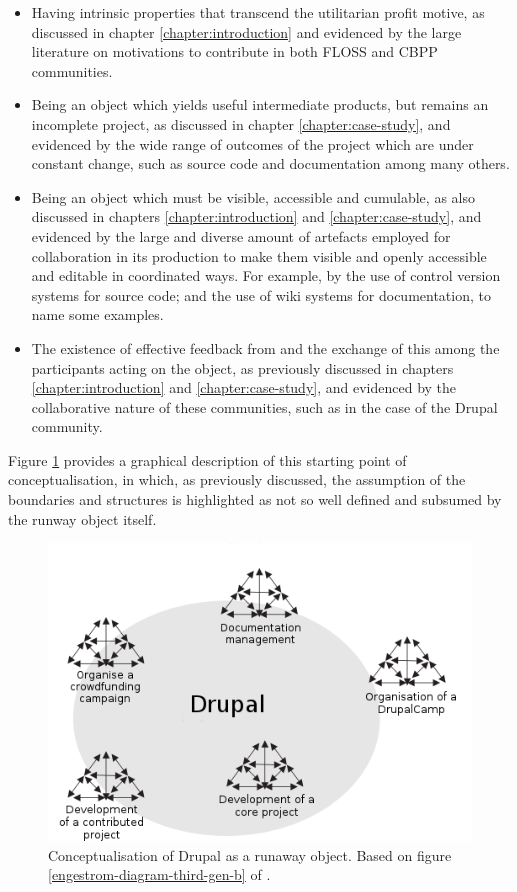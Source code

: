 \begin{itemize}
	\item Having intrinsic properties that transcend the utilitarian profit motive, as discussed in chapter \ref{chapter:introduction} and evidenced by the large literature on motivations to contribute in both FLOSS and CBPP communities. 
	\item Being an object which yields useful intermediate products, but remains an incomplete project, as discussed in chapter \ref{chapter:case-study}, and evidenced by the wide range of outcomes of the project which are under constant change, such as source code and documentation among many others. 
	\item Being an object which must be visible, accessible and cumulable, as also discussed in chapters \ref{chapter:introduction} and \ref{chapter:case-study}, and evidenced by the large and diverse amount of artefacts employed for collaboration in its production to make them visible and openly accessible and editable in coordinated ways. For example, by the use of control version systems for source code; and the use of wiki systems for documentation, to name some examples.
	\item The existence of effective feedback from and the exchange of this among the participants acting on the object, as previously discussed in chapters \ref{chapter:introduction} and \ref{chapter:case-study}, and evidenced by the collaborative nature of these communities, such as in the case of the Drupal community.
\end{itemize}

Figure \ref{drupal_runaway_object} provides a graphical description of this starting point of conceptualisation, in which, as previously discussed, the assumption of the boundaries and structures is highlighted as not so well defined and subsumed by the runway object itself.

\begin{figure}[h]
	\centering
	\includegraphics[scale=0.6]{diagrams/drupal_runaway_object.png}
	\caption[Conceptualisation of Drupal as a runaway object]%
	{Conceptualisation of Drupal as a runaway object. Based on figure \ref{engestrom-diagram-third-gen-b} of \textcite[306]{engestrom_future_2009}.}
	\label{drupal_runaway_object}
\end{figure}

